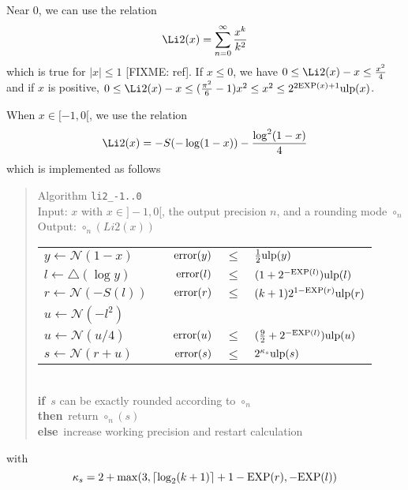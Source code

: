 \documentclass[12pt]{amsart}
\def\n{\textnormal}
\def\pinf{\bigtriangleup}
\def\ulp{{\rm ulp}}
\def\Exp{{\rm EXP}}
\def\N{{\mathcal N}}
\def\If{{\bf if}}
\def\then{{\bf then}}
\def\Else{{\bf else}}
\begin{document}
Near 0, we can use the relation
\[
\Li2(x) = \sum_{n=0}^{\infty}\frac{x^k}{k^2}
\]
which is true for $|x| \leq 1$ [FIXME: ref].
If $x \leq 0$, we have $0 \leq \Li2(x) - x \leq \frac{x^2}{4}$ 
and if $x$ is positive, 
$0 \leq \Li2(x) - x \leq (\frac{\pi^2}{6}-1)x^2 \leq x^2 
\leq 2^{2\Exp(x)+1}\ulp(x)$.

 
When $x \in [-1, 0[$, we use the relation
\[
\Li2(x) = - S(-\log(1-x)) - \frac{\log^2(1-x)}{4}
\]
which is implemented as follows
\begin{quote}
Algorithm {\tt li2\_-1..0}\\
Input: $x$ with $x \in ]-1, 0[$, the output precision $n$, and a rounding mode
    $\circ_n$ \\
Output: $\circ_n(Li2(x))$ \\
\begin{tabular}{l c r c l}
$y \leftarrow \N(1 - x)$ & &
$\n{error}(y) $ & $ \leq $ & $ \frac{1}{2}\ulp(y)$ \\
$l \leftarrow \pinf(\log y)$ & &
$\n{error}(l) $ & $ \leq $ & $ (1+2^{-\Exp(l)})\ulp(l)$\\
$r \leftarrow \N(-S(l))$ & &
$\n{error}(r) $ & $ \leq $ & $ (k+1)2^{1-\Exp(r)} \ulp(r)$\\

$u \leftarrow \N(-l^2)$ \\
$u \leftarrow \N(u/4)$ & &
$\n{error}(u) $ & $ \leq $ & $(\frac{9}{2} + 2^{-\Exp(l)}) \ulp(u)$\\
$s \leftarrow \N(r + u)$ & &
$\n{error}(s) $ & $ \leq $ & $2^{\kappa_s}\ulp(s)$\\
\end{tabular}\\
\If\ $s$ can be exactly rounded according to $\circ_n$\\
\then\ return $\circ_n(s)$\\
\Else\ increase working precision and restart calculation
\end{quote}
with 
\[
\kappa_s = 2 + {\rm max}(3, \lceil\log_2(k+1)\rceil + 1 - \Exp(r), - \Exp(l))
\]
\end{document}
